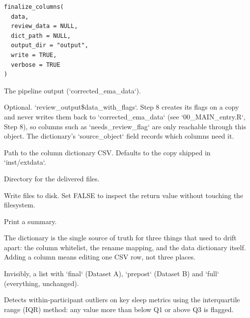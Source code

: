 \documentclass[a4paper]{book}
\begin{document}
%
\begin{Usage}
\begin{verbatim}
finalize_columns(
  data,
  review_data = NULL,
  dict_path = NULL,
  output_dir = "output",
  write = TRUE,
  verbose = TRUE
)
\end{verbatim}
\end{Usage}
%
\begin{Arguments}
\begin{ldescription}
\item[\code{data}] The pipeline output (`corrected\_ema\_data`).

\item[\code{review\_data}] Optional. `review\_output\$data\_with\_flags`. Step 8 creates
its flags on a copy and never writes them back to `corrected\_ema\_data`
(see `00\_MAIN\_entry.R`, Step 8), so columns such as `needs\_review\_flag`
are only reachable through this object. The dictionary's `source\_object`
field records which columns need it.

\item[\code{dict\_path}] Path to the column dictionary CSV. Defaults to the copy
shipped in `inst/extdata`.

\item[\code{output\_dir}] Directory for the delivered files.

\item[\code{write}] Write files to disk. Set FALSE to inspect the return
value without touching the filesystem.

\item[\code{verbose}] Print a summary.
\end{ldescription}
\end{Arguments}
%
\begin{Details}
The dictionary is the single source of truth for three things that used to
drift apart: the column whitelist, the rename mapping, and the data
dictionary itself. Adding a column means editing one CSV row, not three
places.
\end{Details}
%
\begin{Value}
Invisibly, a list with `final` (Dataset A), `prepost` (Dataset B)
and `full` (everything, unchanged).
\end{Value}
%
\begin{Description}
Detects within-participant outliers on key sleep metrics using the
interquartile range (IQR) method: any value more than 
below Q1 or above Q3 is flagged.
\end{Description}
\end{document}
